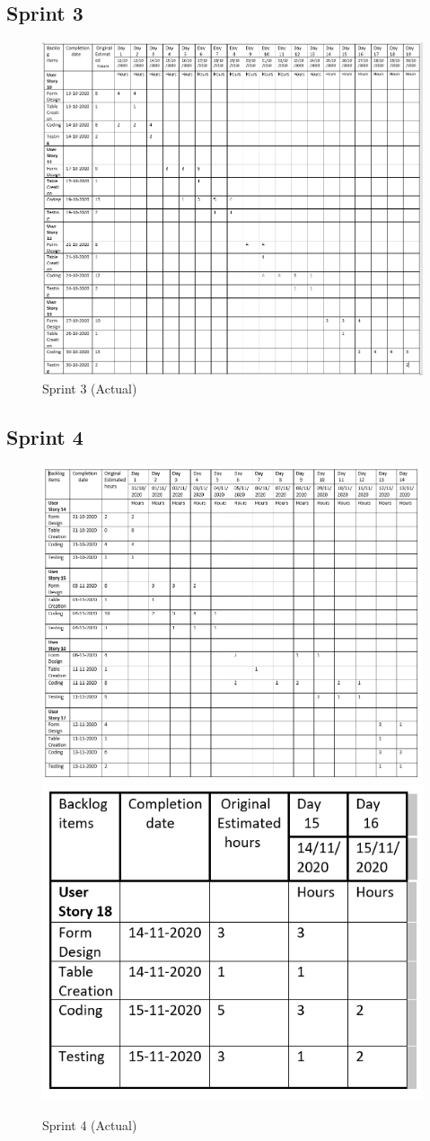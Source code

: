 \documentclass[a4paper,12pt]{report}
\begin{document}
\subsection {Sprint 3}
\begin{figure}[bph]
	\centering
	\includegraphics[width=0.9\linewidth]{img/sprint/sp3a}
	\caption{Sprint 3 (Actual)}
\end{figure}
\pagebreak
\subsection {Sprint 4}
\begin{figure}[bph]
	\centering
	\includegraphics[width=0.85\linewidth]{img/sprint/sp4a1}
	\includegraphics[width=0.3\linewidth]{img/sprint/sp4a2}
	\caption{Sprint 4 (Actual)}
\end{figure}
\pagebreak
\end{document}
